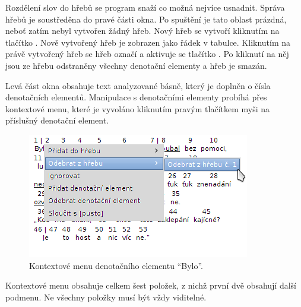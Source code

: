 \documentclass[dp.tex]{subfiles}
\begin{document}
Rozdělení slov do hřebů se program snaží co možná nejvíce usnadnit. Správa hřebů je soustředěna do pravé části okna. Po spuštění je tato oblast prázdná, neboť zatím nebyl vytvořen žádný hřeb. Nový hřeb se vytvoří kliknutím na tlačítko . Nově vytvořený hřeb je zobrazen jako řádek v tabulce. Kliknutím na právě vytvořený hřeb se hřeb označí a aktivuje se tlačítko . Po kliknutí na něj jsou ze hřebu odstraněny všechny denotační elementy a hřeb je smazán.

Levá část okna obsahuje text analyzované básně, který je doplněn o čísla denotačních elementů. Manipulace s denotačními elementy probíhá přes kontextové menu, které je vyvoláno kliknutím pravým tlačítkem myši na příslušný denotační element.

\begin{figure}[H]
\centering
\includegraphics[max width=\textwidth,keepaspectratio=true]{imgs-60-aplikace/gui-denotation-element-menu}
\caption{Kontextové menu denotačního elementu \enquote{Bylo}.}
\label{fig:gui-denotation-menu}
\end{figure}

Kontextové menu obsahuje celkem šest položek, z nichž první dvě obsahují další podmenu. Ne všechny položky musí být vždy viditelné.
\end{document}
